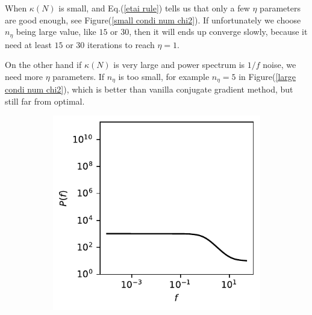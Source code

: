 \documentclass[11pt, letterpaper]{article}
\begin{document}
When $\kappa(N)$ is small, and Eq.(\ref{etai rule}) tells us that only a few
$\eta$ parameters are good enough, see Figure(\ref{small condi num chi2}).
If unfortunately we choose $n_{\eta}$ being large value, like $15$ or $30$,
then it will ends up converge slowly, because it need at least $15$ or $30$
iterations to reach $\eta=1$.

On the other hand if $\kappa(N)$ is very large and power spectrum is $1/f$
noise, we need more $\eta$ parameters.
If $n_{\eta}$ is too small, for example $n_{\eta}=5$ in
Figure(\ref{large condi num chi2}), which is better than vanilla conjugate
gradient method, but still far from optimal.


\begin{figure}[htb]
\centering
\begin{subfigure}{0.33\textwidth}
    \centering
    \includegraphics[width=\linewidth]
        {./images/0.1/small_condition_num/P_f.pdf}
    \caption{}
    \label{small condi num power spectrum}
\end{subfigure}%
\begin{subfigure}{0.33\textwidth}
    \centering

\end{subfigure}
\end{figure}
\end{document}
